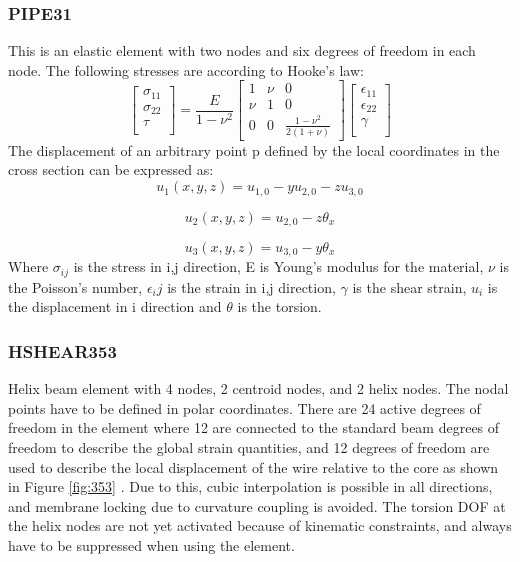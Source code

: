 \subsubsection{PIPE31}
This is an elastic element with two nodes and six degrees of freedom in each node. The following stresses are according to Hooke's law:
\begin{equation}
    \begin{bmatrix}
       \sigma_{11}\\[0.3em]
       \sigma_{22}\\[0.3em]
        \tau\\[0.3em]
     \end{bmatrix}= \frac{E}{1-\nu^2}  \begin{bmatrix}
       1 & \nu & 0           \\[0.3em]
       \nu & 1      & 0 \\[0.3em]
       0           & 0& \frac{1-\nu^2}{2(1+\nu)}
     \end{bmatrix} \begin{bmatrix}
       \epsilon_{11}\\[0.3em]
       \epsilon_{22}\\[0.3em]
        \gamma\\[0.3em]
     \end{bmatrix}
\end{equation}
The displacement of an arbitrary point p defined by the local coordinates in the cross section can be expressed as:
\begin{equation}
    u_1(x,y,z)=u_{1,0}-yu_{2,0}-zu_{3,0}
\end{equation}

\begin{equation}
    u_2(x,y,z)=u_{2,0}-z\theta_x
\end{equation}

\begin{equation}
    u_3(x,y,z)=u_{3,0}-y\theta_x
\end{equation}
\noindent Where $\sigma_{ij}$ is the stress in i,j direction, E is Young's modulus for the material, $\nu$ is the Poisson's number, $\epsilon_ij$ is the strain in i,j direction, $\gamma$ is the shear strain, $u_i$ is the displacement in i direction and $\theta$ is the torsion.  
\subsubsection{HSHEAR353}
Helix beam element with 4 nodes, 2 centroid nodes, and 2 helix nodes. The nodal points have to be defined in polar coordinates. There are 24 active degrees of freedom in the element where 12 are connected to the standard beam degrees of freedom to describe the global strain quantities, and 12 degrees of freedom are used to describe the local displacement of the wire relative to the core as shown in Figure \ref{fig:353} . Due to this, cubic interpolation is possible in all directions, and membrane locking due to curvature coupling is avoided. The torsion DOF at the helix nodes are not yet activated because of kinematic constraints, and always have to be suppressed when using the element.

